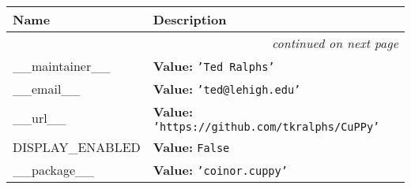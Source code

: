     \vspace{-1cm}
\hspace{\varindent}\begin{longtable}{|p{\varnamewidth}|p{\vardescrwidth}|l}
\cline{1-2}
\cline{1-2} \centering \textbf{Name} & \centering \textbf{Description}& \\
\cline{1-2}
\endhead\cline{1-2}\multicolumn{3}{r}{\small\textit{continued on next page}}\\\endfoot\cline{1-2}
\endlastfoot\raggedright \_\-\_\-m\-a\-i\-n\-t\-a\-i\-n\-e\-r\-\_\-\_\- & \raggedright \textbf{Value:} 
{\tt \texttt{'}\texttt{Ted Ralphs}\texttt{'}}&\\
\cline{1-2}
\raggedright \_\-\_\-e\-m\-a\-i\-l\-\_\-\_\- & \raggedright \textbf{Value:} 
{\tt \texttt{'}\texttt{ted@lehigh.edu}\texttt{'}}&\\
\cline{1-2}
\raggedright \_\-\_\-u\-r\-l\-\_\-\_\- & \raggedright \textbf{Value:} 
{\tt \texttt{'}\texttt{https://github.com/tkralphs/CuPPy}\texttt{'}}&\\
\cline{1-2}
\raggedright D\-I\-S\-P\-L\-A\-Y\-\_\-E\-N\-A\-B\-L\-E\-D\- & \raggedright \textbf{Value:} 
{\tt False}&\\
\cline{1-2}
\raggedright \_\-\_\-p\-a\-c\-k\-a\-g\-e\-\_\-\_\- & \raggedright \textbf{Value:} 
{\tt \texttt{'}\texttt{coinor.cuppy}\texttt{'}}&\\
\cline{1-2}
\end{longtable}

